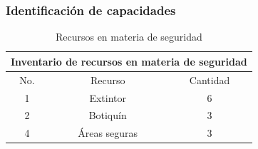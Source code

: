     
    \subsubsection{Identificación de capacidades}
    
    \begin{table}[H]
        \centering
        \caption{Recursos en materia de seguridad}
        \begin{tabular}{c c c}
        \hline
        \multicolumn{3}{c}{Inventario de recursos en materia de seguridad}\\
        \hline
             No.& Recurso & Cantidad  \\
        \hline
             1& Extintor & 6  \\
        \hline
             2& Botiquín & 3  \\
        \hline
             4& Áreas seguras & 3 \\
        \hline     
        \end{tabular}
        \label{tab:inventario}
    \end{table}
